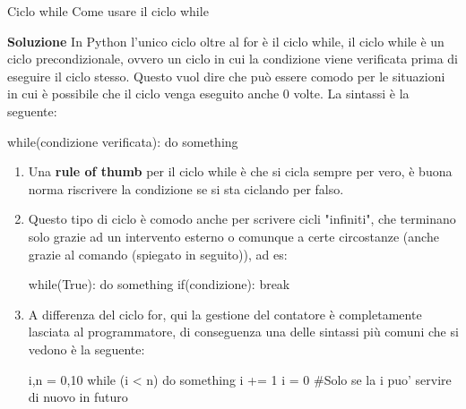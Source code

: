 \documentclass[10pt]{article}
\makeatletter
\newcommand{\<}{\langle}
\renewcommand{\>}{\rangle}
\renewenvironment{proof}[1][\proofname] {\par\pushQED{\qed}
\renewcommand*{\proofname}{Soluzione}
{\normalfont\sffamily\bfseries\topsep6\p@\@plus6\p@\relax #1\@addpunct{.} }}{\popQED\endtrivlist\@endpefalse}
\theoremstyle{mystyle}{\newtheorem*{remark}{Nota}}
\theoremstyle{mystyle}{\newtheorem*{remarks}{Note}}
\theoremstyle{mystyle}{\newtheorem*{example}{Esempio}}
\theoremstyle{mystyle}{\newtheorem*{examples}{Esempi}}
\theoremstyle{definition}{\newtheorem*{exercise}{Exercise}}
\theoremstyle{warn}
\makeatother
\begin{document}
\begin{definition}{Ciclo while}{}
Come usare il ciclo while
\end{definition}
\begin{proof}
In Python l'unico ciclo oltre al for è il ciclo while, il ciclo while è un ciclo precondizionale, ovvero un ciclo in cui la condizione viene verificata prima di eseguire il ciclo stesso. Questo vuol dire che può essere comodo per le situazioni in cui è possibile che il ciclo venga eseguito anche 0 volte. La sintassi è la seguente:
\begin{python}
while(condizione verificata):
    do something
\end{python}
\end{proof}
\begin{remarks} \leavevmode
\begin{enumerate}
    \item Una  \textbf{rule of thumb} per il ciclo while è che si cicla sempre per vero, è buona norma riscrivere la condizione se si sta ciclando per falso.
    \item Questo tipo di ciclo è comodo anche per scrivere cicli "infiniti", che terminano solo grazie ad un intervento esterno o comunque a certe circostanze (anche grazie al comando  (spiegato in seguito)), ad es:
    \begin{python}
while(True):
    do something
    if(condizione):
        break
    \end{python}
    \item A differenza del ciclo for, qui la gestione del contatore è completamente lasciata al programmatore, di conseguenza una delle sintassi più comuni che si vedono è la seguente:
    \begin{python}
i,n = 0,10
while (i < n)
    do something
    i += 1
i = 0 #Solo se la i puo' servire di nuovo in futuro
    \end{python}
\end{enumerate}
\end{remarks}
\end{document}
